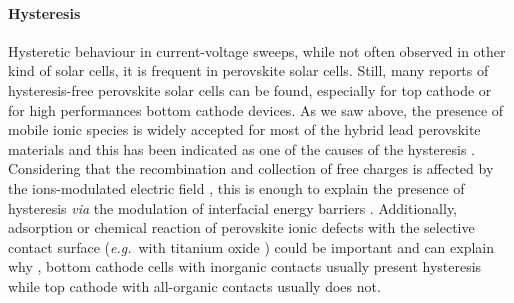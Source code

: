 	\paragraph{Hysteresis}
	Hysteretic behaviour in current-voltage sweeps, while not often observed in other kind of solar cells, it is frequent in perovskite solar cells.
	Still, many reports of hysteresis-free perovskite solar cells can be found, especially for top cathode or for high performances bottom cathode devices.
	As we saw above, the presence of mobile ionic species is widely accepted for most of the hybrid lead perovskite materials and this has been indicated as one of the causes of the hysteresis \cite{Unger2014,Xiao2015}.
	Considering that the recombination and collection of free charges is affected by the ions-modulated electric field \cite{Pockett2017}, this is enough to explain the presence of hysteresis \cite{Tress2015,Calado2016} \textsl{via} the modulation of interfacial energy barriers \cite{Moia2019}.
	Additionally, adsorption or chemical reaction of perovskite ionic defects with the selective contact surface (\textsl{e.g.}\ with titanium oxide \cite{Yu2016,Beilsten-Edmands2015,Carrillo2016}) could be important and can explain why \cite{Moia2019}, bottom cathode cells with inorganic contacts usually present hysteresis while top cathode with all-organic contacts usually does not.



